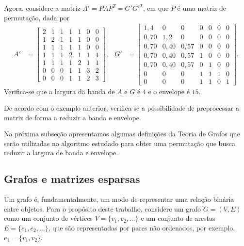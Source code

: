 \begin{exem}
    Agora, considere a matriz $A' = P A P^T = G' G'^T$, em que $P$ é uma matriz de
    permutação, dada por
    \begin{align*}
        A' &= \begin{bmatrix}
            2 & 1 & 1 & 1 & 1 & 0 & 0 \\
            1 & 2 & 1 & 1 & 1 & 0 & 0 \\
            1 & 1 & 1 & 1 & 1 & 0 & 0 \\
            1 & 1 & 1 & 2 & 1 & 1 & 1 \\
            1 & 1 & 1 & 1 & 2 & 1 & 1 \\
            0 & 0 & 0 & 1 & 1 & 3 & 2 \\
            0 & 0 & 0 & 1 & 1 & 2 & 3
        \end{bmatrix},
        & G' &= \begin{bmatrix}
             1,4 & 0 & 0 & 0 & 0 & 0 & 0 \\
            0,70 & 1,2 & 0 & 0 & 0 & 0 & 0 \\
            0,70 & 0,40 & 0,57 & 0 & 0 & 0 & 0 \\
            0,70 & 0,40 & 0,57 & 1 & 0 & 0 & 0 \\
            0,70 & 0,40 & 0,57 & 0 & 1 & 0 & 0 \\
            0 & 0 & 0 & 1 & 1 & 1 & 0 \\
            0 & 0 & 0 & 1 & 1 & 0 & 1
        \end{bmatrix}.
    \end{align*}
    Verifica-se que a largura da banda de $A$ e $G$ é $4$ e o envelope é $15$.
\end{exem}

De acordo com o exemplo anterior, verifica-se a possibilidade de preprocessar a matriz
de forma a reduzir a banda e envelope.

Na próxima subseção apresentamos algumas definições da Teoria de Grafos que
serão utilizadas no algoritmo estudado para obter uma permutação que busca
reduzir a largura de banda e envelope.

\subsection{Grafos e matrizes esparsas}
Um grafo é, fundamentalmente, um modo de representar uma relação binária entre
objetos. Para o propósito deste trabalho, considere um grafo $G = (V, E)$ como
um conjunto de vértices $V = \{v_1, v_2, \ldots \}$ e um conjunto de
arestas $E = \{e_1, e_2, \ldots \}$, que são representadas por pares
não ordenados, por exemplo, $e_1 = \{v_1 , v_2\}$.

